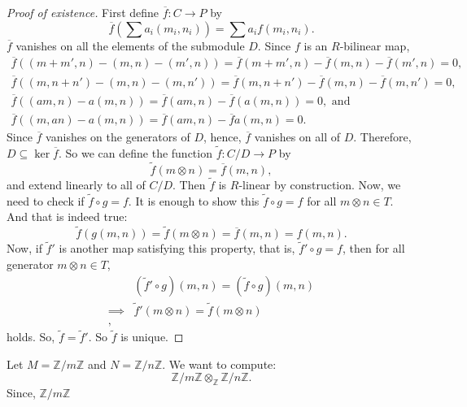 \begin{proof}[Proof of existence]
    First define \( \overline{f}: C \to P \) by
    \[
        \overline{f}\left(\sum a_i(m_i, n_i)\right) = \sum a_i f(m_i, n_i).
    \]
    \( \overline{f} \) vanishes on all the elements of the submodule \( D \). Since \( f \) is an  \( R \)-bilinear map,
     \begin{gather*}
        \overline{f}((m + m', n) - (m, n) - (m', n)) = \overline{f}(m + m', n) - \overline{f}(m, n) - \overline{f}(m', n) = 0,\\
        \overline{f}((m, n + n') - (m, n) - (m, n')) = \overline{f}(m, n + n') - \overline{f}(m, n) - \overline{f}(m, n') = 0,\\
        \overline{f}((am, n) - a(m,n)) = \overline{f}(am, n) - \overline{f}(a(m,n)) = 0, \text{ and}\\
    \overline{f}((m,an) - a(m, n)) = \overline{f}(am, n) - \overline{f}a(m, n) = 0.
    \end{gather*}
    Since \( \overline{f} \) vanishes on the generators of \( D \), hence,  \( \overline{f} \) vanishes on all of \( D \). Therefore,  \( D \subseteq \ker \overline{f}\). So we can define the function \( \widetilde{f}: C / D \to P \) by
     \[
        \widetilde{f}(m \otimes n) = \overline{f}(m,n),
    \]
    and extend linearly to all of \( C / D \).  Then \( \widetilde{f} \) is  \( R \)-linear by construction. Now, we need to check if  \( \widetilde{f} \circ g = f \). It is enough to show this  \( \widetilde{f} \circ g = f \) for all  \( m\otimes n \in T \). And that is indeed true:
    \[
        \widetilde{f}(g(m, n)) =  \widetilde{f} (m \otimes n) = \overline{f}(m, n) = f(m,n).
    \]
    Now, if \( \widetilde{f}' \) is another map satisfying this property, that is,  \( \widetilde{f}' \circ g = f \), then for all generator \( m \otimes n \in T\),
     \begin{align*}
         & (\widetilde{f}' \circ g)(m, n) = (\widetilde{f} \circ g)(m, n)\\
         \implies &\widetilde{f}'(m \otimes n) = \widetilde{f}(m \otimes n)\\
    ,\end{align*}
    holds. So, \( \widetilde{f} = \widetilde{f}' \). So  \( \widetilde{f} \) is unique.
\end{proof}
\begin{example}
    Let \( M = \mathbb{Z}/m\mathbb{Z} \)  and \( N = \mathbb{Z}/n\mathbb{Z} \). We want to compute:
     \[
        \mathbb{Z}/m\mathbb{Z} \otimes_\mathbb{Z} \mathbb{Z}/n\mathbb{Z}.
     \]
    Since, \( \mathbb{Z}/m\mathbb{Z} \)
\end{example}

